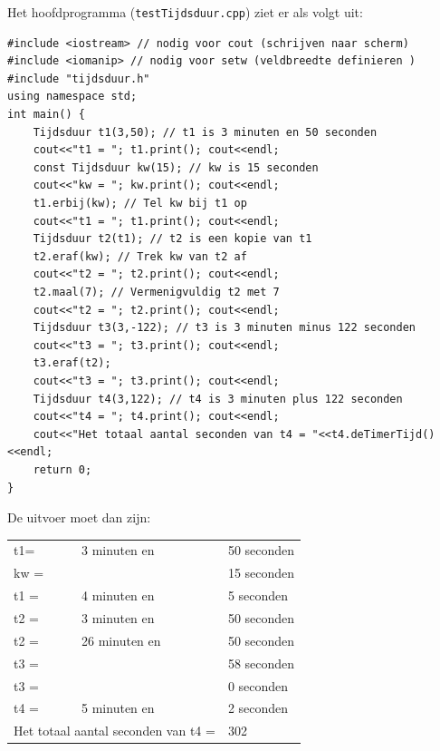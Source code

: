 Het hoofdprogramma (\texttt{testTijdsduur.cpp}) ziet er als volgt uit:
\begin{lstlisting}[caption= de implementatiefile van het hoofdprogramma ,label={lst:tijdsdMainprog},numbers=none]
#include <iostream> // nodig voor cout (schrijven naar scherm)
#include <iomanip> // nodig voor setw (veldbreedte definieren )
#include "tijdsduur.h"
using namespace std;
int main() {
	Tijdsduur t1(3,50); // t1 is 3 minuten en 50 seconden
	cout<<"t1 = "; t1.print(); cout<<endl;
	const Tijdsduur kw(15); // kw is 15 seconden
	cout<<"kw = "; kw.print(); cout<<endl;
	t1.erbij(kw); // Tel kw bij t1 op
	cout<<"t1 = "; t1.print(); cout<<endl;
	Tijdsduur t2(t1); // t2 is een kopie van t1
	t2.eraf(kw); // Trek kw van t2 af
	cout<<"t2 = "; t2.print(); cout<<endl;
	t2.maal(7); // Vermenigvuldig t2 met 7
	cout<<"t2 = "; t2.print(); cout<<endl;
	Tijdsduur t3(3,-122); // t3 is 3 minuten minus 122 seconden
	cout<<"t3 = "; t3.print(); cout<<endl;
	t3.eraf(t2); 
	cout<<"t3 = "; t3.print(); cout<<endl;
	Tijdsduur t4(3,122); // t4 is 3 minuten plus 122 seconden
	cout<<"t4 = "; t4.print(); cout<<endl;
	cout<<"Het totaal aantal seconden van t4 = "<<t4.deTimerTijd()<<endl;
	return 0;
}	
\end{lstlisting}
De uitvoer moet dan zijn:

\begin{tabular}{ l l l }
	t1= & 3 minuten en & 50 seconden \\ 
	kw	=& &15	seconden \\  
	t1	=&	4	minuten en&	5	seconden\\
	t2	=&	3	minuten en	&50	seconden\\
	t2	=&	26	minuten en	&50	seconden\\
	t3	=&			&58	seconden\\
	t3	=&			&0	seconden\\
	t4	=&	5	minuten en	&2	seconden\\
	\multicolumn{2}{l}{Het totaal aantal seconden van t4 =}&302
\end{tabular}

